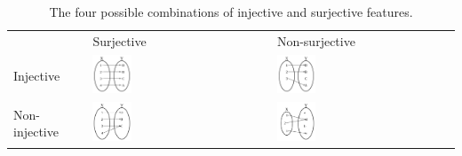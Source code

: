 \begin{table}
\caption{The four possible combinations of injective and surjective features.}
	\label{tab_functions_1}
\begin{center}
	\begin{tabular}{m{} >{\centering\arraybackslash}m{} >{\centering\arraybackslash}m{}}
	&Surjective&Non-surjective\\
	Injective&\includegraphics[width=0.225\textwidth]{fig_functions_15a}&\includegraphics[width=0.225\textwidth]{fig_functions_15b}\\
	Non-injective&\includegraphics[width=0.225\textwidth]{fig_functions_15c}&\includegraphics[width=0.225\textwidth]{fig_functions_15d}\\
	\end{tabular}
\end{center}
\end{table}

